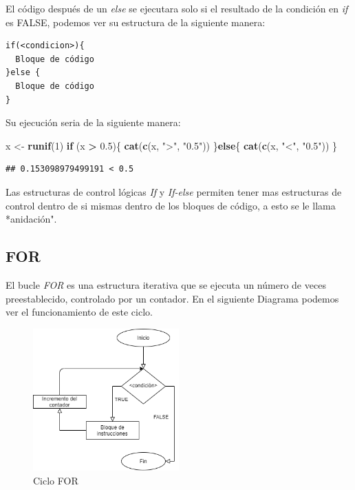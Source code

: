 \documentclass[11pt,]{article}
\newenvironment{Shaded}{\begin{snugshade}}{\end{snugshade}}
\newcommand{\ControlFlowTok}[1]{\textcolor[rgb]{0.13,0.29,0.53}{\textbf{#1}}}
\newcommand{\DecValTok}[1]{\textcolor[rgb]{0.00,0.00,0.81}{#1}}
\newcommand{\FloatTok}[1]{\textcolor[rgb]{0.00,0.00,0.81}{#1}}
\newcommand{\KeywordTok}[1]{\textcolor[rgb]{0.13,0.29,0.53}{\textbf{#1}}}
\newcommand{\NormalTok}[1]{#1}
\newcommand{\OperatorTok}[1]{\textcolor[rgb]{0.81,0.36,0.00}{\textbf{#1}}}
\newcommand{\StringTok}[1]{\textcolor[rgb]{0.31,0.60,0.02}{#1}}
\begin{document}
El código después de un \emph{else} se ejecutara solo si el resultado de
la condición en \emph{if} es FALSE, podemos ver su estructura de la
siguiente manera:

\begin{verbatim}
if(<condicion>){
  Bloque de código
}else {
  Bloque de código
}
\end{verbatim}

Su ejecución seria de la siguiente manera:

\begin{Shaded}
\begin{Highlighting}[]
\NormalTok{x <-}\StringTok{ }\KeywordTok{runif}\NormalTok{(}\DecValTok{1}\NormalTok{)}
\ControlFlowTok{if}\NormalTok{ (x }\OperatorTok{>}\StringTok{ }\FloatTok{0.5}\NormalTok{)\{}
  \KeywordTok{cat}\NormalTok{(}\KeywordTok{c}\NormalTok{(x, }\StringTok{">"}\NormalTok{, }\StringTok{"0.5"}\NormalTok{))}
\NormalTok{\}}\ControlFlowTok{else}\NormalTok{\{}
  \KeywordTok{cat}\NormalTok{(}\KeywordTok{c}\NormalTok{(x, }\StringTok{"<"}\NormalTok{, }\StringTok{"0.5"}\NormalTok{))}
\NormalTok{\}}
\end{Highlighting}
\end{Shaded}

\begin{verbatim}
## 0.153098979499191 < 0.5
\end{verbatim}

Las estructuras de control lógicas \emph{If} y \emph{If-else} permiten
tener mas estructuras de control dentro de si mismas dentro de los
bloques de código, a esto se le llama *anidación".

\hypertarget{for}{%
\subsection{FOR}\label{for}}

El bucle \emph{FOR} es una estructura iterativa que se ejecuta un número
de veces preestablecido, controlado por un contador. En el siguiente
Diagrama podemos ver el funcionamiento de este ciclo.

\begin{figure}
\hypertarget{id}{%
\centering
\includegraphics[width=0.5\textwidth,height=0.3\textheight]{../schemas/FOR.png}
\caption{Ciclo FOR}\label{id}
}
\end{figure}
\end{document}
